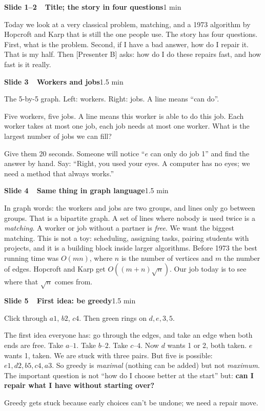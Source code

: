 \documentclass[11pt,a4paper]{article}
\newcommand{\slidehead}[3]{%
  \Needspace{9\baselineskip}\vspace{4pt}\noindent\colorbox{hkblue!12}{\parbox{\dimexpr\linewidth-2\fboxsep}{%
  \textbf{\color{hkblue}Slide #1\ \ #2}\hfill{\small\color{hkgrey}#3}}}\par\vspace{2pt}}
\begin{document}
\slidehead{1--2}{Title; the story in four questions}{1 min}
\begin{say}
Today we look at a very classical problem, matching, and a 1973 algorithm by Hopcroft and Karp that is still the one people use. The story has four questions. First, what is the problem. Second, if I have a bad answer, how do I repair it. That is my half. Then [Presenter B] asks: how do I do these repairs fast, and how fast is it really.
\end{say}

\slidehead{3}{Workers and jobs}{1.5 min}
\begin{onscreen}
The 5-by-5 graph. Left: workers. Right: jobs. A line means ``can do''.
\end{onscreen}
\begin{say}
Five workers, five jobs. A line means this worker is able to do this job. Each worker takes at most one job, each job needs at most one worker. What is the largest number of jobs we can fill?
\end{say}
\begin{ask}
Give them 20 seconds. Someone will notice ``$e$ can only do job 1'' and find the answer by hand. Say: ``Right, you used your eyes. A computer has no eyes; we need a method that always works.''
\end{ask}

\slidehead{4}{Same thing in graph language}{1.5 min}
\begin{say}
In graph words: the workers and jobs are two groups, and lines only go between groups. That is a bipartite graph. A set of lines where nobody is used twice is a \emph{matching}. A worker or job without a partner is \emph{free}. We want the biggest matching.
This is not a toy: scheduling, assigning tasks, pairing students with projects, and it is a building block inside larger algorithms. Before 1973 the best running time was $O(mn)$, where $n$ is the number of vertices and $m$ the number of edges. Hopcroft and Karp get $O((m+n)\sqrt n)$. Our job today is to see where that $\sqrt n$ comes from.
\end{say}

\slidehead{5}{First idea: be greedy}{1.5 min}
\begin{onscreen}
Click through $a1$, $b2$, $c4$. Then green rings on $d,e,3,5$.
\end{onscreen}
\begin{say}
The first idea everyone has: go through the edges, and take an edge when both ends are free. Take $a$--$1$. Take $b$--$2$. Take $c$--$4$. Now $d$ wants 1 or 2, both taken. $e$ wants 1, taken. We are stuck with three pairs.
But five is possible: $e1, d2, b5, c4, a3$. So greedy is \emph{maximal} (nothing can be added) but not \emph{maximum}. The important question is not ``how do I choose better at the start'' but: \textbf{can I repair what I have without starting over?}
\end{say}
\begin{key}Greedy gets stuck because early choices can't be undone; we need a repair move.\end{key}
\end{document}
